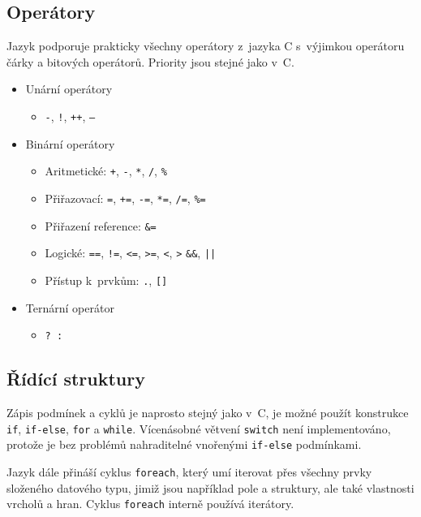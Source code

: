 \documentclass[11pt,twoside,a4paper]{book}
\begin{document}
\subsection{Operátory}

Jazyk podporuje prakticky všechny operátory z~jazyka C s~výjimkou operátoru čárky a bitových operátorů. Priority jsou stejné jako v~C.

\begin{itemize}
\item Unární operátory
	\begin{itemize}
	\item \texttt{-}, \texttt{!}, \texttt{++}, \texttt{--}
	\end{itemize}
\item Binární operátory
	\begin{itemize}
	\item Aritmetické: \texttt{+}, \texttt{-}, \texttt{*}, \texttt{/}, \texttt{\%}
	\item Přiřazovací: \texttt{=}, \texttt{+=}, \texttt{-=}, \texttt{*=}, \texttt{/=}, \texttt{\%=}
	\item Přiřazení reference: \texttt{\&=}
	\item Logické: \texttt{==}, \texttt{!=}, \texttt{<=}, \texttt{>=}, \texttt{<}, \texttt{>} \texttt{\&\&}, \texttt{||}
	\item Přístup k~prvkům: \texttt{.}, \texttt{[]}
	\end{itemize}
\item Ternární operátor
	\begin{itemize}
	\item \texttt{? :}
	\end{itemize}
\end{itemize}


\subsection{Řídící struktury}

Zápis podmínek a cyklů je naprosto stejný jako v~C, je možné použít konstrukce \texttt{if}, \texttt{if-else}, \texttt{for} a \texttt{while}. Vícenásobné větvení \texttt{switch} není implementováno, protože je bez problémů nahraditelné vnořenými \texttt{if-else} podmínkami.

Jazyk dále přináší cyklus \texttt{foreach}, který umí iterovat přes všechny prvky složeného datového typu, jimiž jsou například pole a struktury, ale také vlastnosti vrcholů a hran. Cyklus \texttt{foreach} interně používá iterátory.
\end{document}
